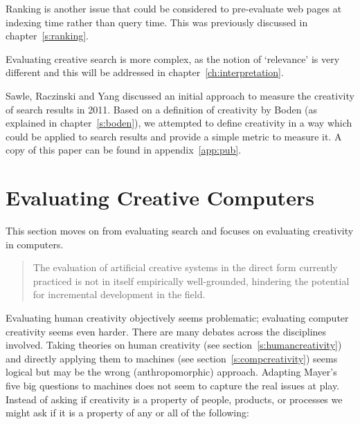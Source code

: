 Ranking is another issue that could be considered to pre-evaluate web pages at indexing time rather than query time. This was previously discussed in chapter~\ref{s:ranking}.

\spirals

Evaluating creative search is more complex, as the notion of `relevance' is very different and this will be addressed in chapter~\ref{ch:interpretation}. 

Sawle, Raczinski and Yang \autocite*{Sawle2011} discussed an initial approach to measure the creativity of search results in 2011. Based on a definition of creativity by Boden (as explained in chapter~\ref{s:boden}), we attempted to define creativity in a way which could be applied to search results and provide a simple metric to measure it. A copy of this paper can be found in appendix~\ref{app:pub}.


\section{Evaluating Creative Computers}
\label{s:creattributes}

This section moves on from evaluating search and focuses on evaluating creativity in computers.

\begin{quotation}
  The evaluation of artificial creative systems in the direct form currently practiced is not in itself empirically well-grounded, hindering the potential for incremental development in the field. 
\end{quotation}

Evaluating human creativity objectively seems problematic; evaluating computer creativity seems even harder. There are many debates across the disciplines involved. Taking theories on human creativity (see section~\ref{s:humancreativity}) and directly applying them to machines (see section~\ref{s:compcreativity}) seems logical but may be the wrong (anthropomorphic) approach. Adapting Mayer's five big questions \autocite*{Mayer1999} to machines does not seem to capture the real issues at play. Instead of asking if creativity is a property of people, products, or processes we might ask if it is a property of any or all of the following:

